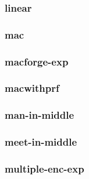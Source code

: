 \begin{frame}\frametitle{linear}
\begin{figure}
\begin{center}

\end{center}
\end{figure}
\end{frame}
\begin{frame}\frametitle{mac}
\begin{figure}
\begin{center}

\end{center}
\end{figure}
\end{frame}
\begin{frame}\frametitle{macforge-exp}
\begin{figure}
\begin{center}

\end{center}
\end{figure}
\end{frame}
\begin{frame}\frametitle{macwithprf}
\begin{figure}
\begin{center}

\end{center}
\end{figure}
\end{frame}
\begin{frame}\frametitle{man-in-middle}
\begin{figure}
\begin{center}

\end{center}
\end{figure}
\end{frame}
\begin{frame}\frametitle{meet-in-middle}
\begin{figure}
\begin{center}

\end{center}
\end{figure}
\end{frame}
\begin{frame}\frametitle{multiple-enc-exp}
\begin{figure}
\begin{center}

\end{center}
\end{figure}
\end{frame}
